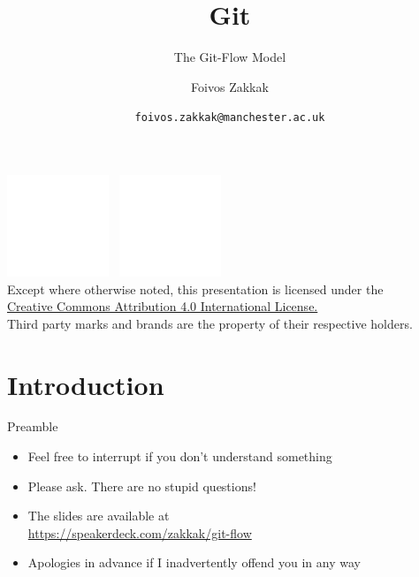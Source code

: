 \documentclass[
14pt,
aspectratio=169,
usenames,
dvipsnames,
x11names]{beamer}
\title[Git: The Git-Flow Model]{Git}
\subtitle{The Git-Flow Model}
\author[\texttt{foivos.zakkak@manchester.ac.uk}]{Foivos Zakkak}
\date{\texttt{foivos.zakkak@manchester.ac.uk}}
\begin{document}


\begin{frame}[plain]
  \titlepage
  \centering
  \includegraphics[height=.75cm]{../creative-commons/cc}~
  \includegraphics[height=.75cm]{../creative-commons/by}\\[1em]
  \scriptsize{Except where otherwise noted, this presentation is licensed under the\\
    \href{http://creativecommons.org/licenses/by/4.0/}%
    {Creative Commons Attribution 4.0 International License.}\\[1ex]
    Third party marks and brands are the property of their respective
    holders.}
\end{frame}


\section{Introduction}

\begin{frame}{Preamble}
  \begin{itemize} \setlength{\itemsep}{\fill}
  \item Feel free to \alert{interrupt} if you don't understand something
  \item Please ask. \alert{There are no stupid questions}!
  \item The slides are available at\\ {\small\url{https://speakerdeck.com/zakkak/git-flow}}
  \item %
    Apologies in advance if I \alert{inadvertently} offend you in any way
  \end{itemize}
\end{frame}
\end{document}
